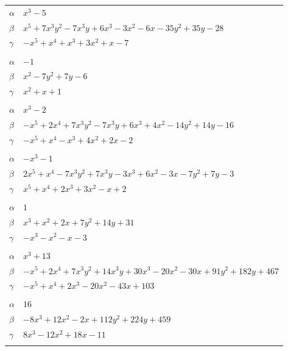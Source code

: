 \documentclass[11pt]{article}
\begin{document}
\begin{longtable}{@{}ll@{}}
$\alpha$ & $x^{3}-5$\\
$\beta$ & $x^{5}+7x^{3}y^{2}-7x^{3}y+6x^{3}-3x^{2}-6x-35y^{2}+35y-28$\\
$\gamma$ & $-x^{5}+x^{4}+x^{3}+3x^{2}+x-7$\\
\addlinespace[3pt]
\multicolumn{2}{@{}l}{$\{i,j\}=\{3,11\}$, $k_{ij}=2\cdot 3$}\\
$\alpha$ & $-1$\\
$\beta$ & $x^{2}-7y^{2}+7y-6$\\
$\gamma$ & $x^{2}+x+1$\\
\addlinespace[3pt]
\multicolumn{2}{@{}l}{$\{i,j\}=\{3,12\}$, $k_{ij}=2^{2}\cdot 3$}\\
$\alpha$ & $x^{3}-2$\\
$\beta$ & $-x^{5}+2x^{4}+7x^{3}y^{2}-7x^{3}y+6x^{3}+4x^{2}-14y^{2}+14y-16$\\
$\gamma$ & $-x^{5}+x^{4}-x^{3}+4x^{2}+2x-2$\\
\addlinespace[3pt]
\multicolumn{2}{@{}l}{$\{i,j\}=\{3,17\}$, $k_{ij}=2^{2}$}\\
$\alpha$ & $-x^{3}-1$\\
$\beta$ & $2x^{5}+x^{4}-7x^{3}y^{2}+7x^{3}y-3x^{3}+6x^{2}-3x-7y^{2}+7y-3$\\
$\gamma$ & $x^{5}+x^{4}+2x^{3}+3x^{2}-x+2$\\
\addlinespace[3pt]
\multicolumn{2}{@{}l}{$\{i,j\}=\{4,5\}$, $k_{ij}=2^{2}\cdot 3\cdot 5$}\\
$\alpha$ & $1$\\
$\beta$ & $x^{3}+x^{2}+2x+7y^{2}+14y+31$\\
$\gamma$ & $-x^{3}-x^{2}-x-3$\\
\addlinespace[3pt]
\multicolumn{2}{@{}l}{$\{i,j\}=\{4,12\}$, $k_{ij}=2\cdot 3\cdot 5^{2}\cdot 7$}\\
$\alpha$ & $x^{3}+13$\\
$\beta$ & $-x^{5}+2x^{4}+7x^{3}y^{2}+14x^{3}y+30x^{3}-20x^{2}-30x+91y^{2}+182y+467$\\
$\gamma$ & $-x^{5}+x^{4}+2x^{3}-20x^{2}-43x+103$\\
\addlinespace[3pt]
\multicolumn{2}{@{}l}{$\{i,j\}=\{4,13\}$, $k_{ij}=3^{3}\cdot 5\cdot 7$}\\
$\alpha$ & $16$\\
$\beta$ & $-8x^{3}+12x^{2}-2x+112y^{2}+224y+459$\\
$\gamma$ & $8x^{3}-12x^{2}+18x-11$\\
\addlinespace[3pt]
\multicolumn{2}{@{}l}{$\{i,j\}=\{4,14\}$, $k_{ij}=2^{2}\cdot 3\cdot 11$}\\

\end{longtable}
\end{document}

